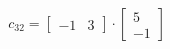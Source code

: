 \documentclass[preview]{standalone}
\begin{document}
\begin{align*}
c_{32} = \begin{bmatrix} -1 & 3 \end{bmatrix} \cdot \begin{bmatrix} 5 \\ -1 \end{bmatrix}
\end{align*}
\end{document}
